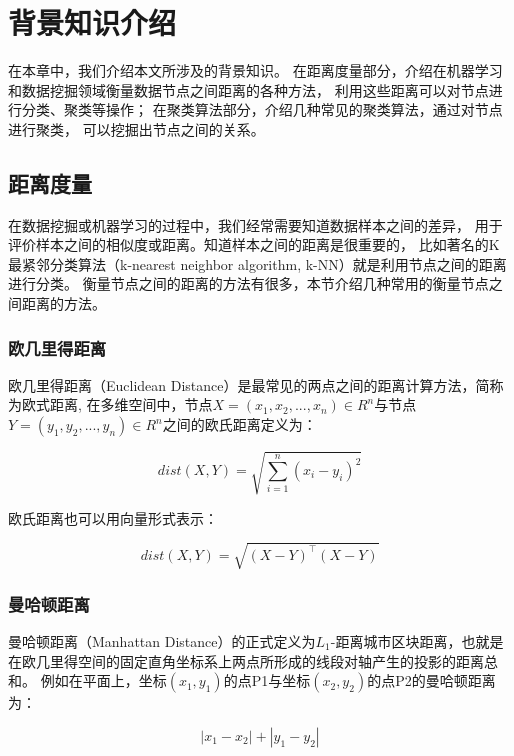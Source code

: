 \chapter{背景知识介绍}
\label{chap:back}

在本章中，我们介绍本文所涉及的背景知识。
在距离度量部分，介绍在机器学习和数据挖掘领域衡量数据节点之间距离的各种方法，
利用这些距离可以对节点进行分类、聚类等操作；
在聚类算法部分，介绍几种常见的聚类算法，通过对节点进行聚类，
可以挖掘出节点之间的关系。

\section{距离度量}
\label{sec:distance-metric}

在数据挖掘或机器学习的过程中，我们经常需要知道数据样本之间的差异，
用于评价样本之间的相似度或距离。知道样本之间的距离是很重要的，
比如著名的K最紧邻分类算法（k-nearest neighbor algorithm, k-NN）就是利用节点之间的距离进行分类。
衡量节点之间的距离的方法有很多，本节介绍几种常用的衡量节点之间距离的方法。

\subsection{欧几里得距离}

欧几里得距离（Euclidean Distance）是最常见的两点之间的距离计算方法，简称为欧式距离,
在多维空间中，节点$X = (x_1, x_2, ..., x_n) \in R ^ n$与节点$Y = (y_1, y_2, ..., y_n) \in R ^ n$之间的欧氏距离定义为：

\begin{equation}
    dist(X, Y) = \sqrt{ \sum_{i=1}^{n} (x_i - y_i)^2}
\end{equation}

欧氏距离也可以用向量形式表示：

\begin{equation}
    dist(X, Y) = \sqrt{(X - Y)^\top(X - Y)}
\end{equation}

\subsection{曼哈顿距离}

曼哈顿距离（Manhattan Distance）的正式定义为$L_1$-距离城市区块距离，也就是在欧几里得空间的固定直角坐标系上两点所形成的线段对轴产生的投影的距离总和。
例如在平面上，坐标$(x_1, y_1)$的点P1与坐标$(x_2, y_2)$的点P2的曼哈顿距离为：

$$
    |x_1 - x_2| + |y_1 - y_2|
$$


